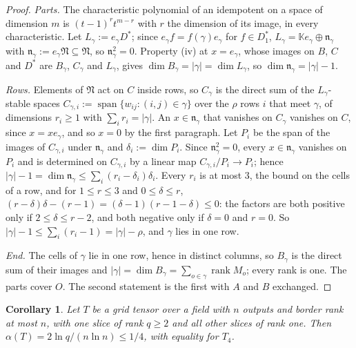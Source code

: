 \documentclass[11pt]{article}
\newtheorem{corollary}[theorem]{Corollary}
\theoremstyle{definition}
\theoremstyle{remark}
\begin{document}
\begin{proof}
\emph{Parts.} The characteristic polynomial of an idempotent on a space of dimension $m$ is $(t-1)^rt^{m-r}$ with $r$ the dimension of its image, in every characteristic. Let $L_\gamma:=e_\gamma D^*$; since $e_\gamma f=f(\gamma)e_\gamma$ for $f\in D^*_1$, $L_\gamma=\mathbb Ke_\gamma\oplus\mathfrak n_\gamma$ with $\mathfrak n_\gamma:=e_\gamma\mathfrak N\subseteq\mathfrak N$, so $\mathfrak n_\gamma^2=0$. Property (iv) at $x=e_\gamma$, whose images on $B$, $C$ and $D^*$ are $B_\gamma$, $C_\gamma$ and $L_\gamma$, gives $\dim B_\gamma=|\gamma|=\dim L_\gamma$, so $\dim\mathfrak n_\gamma=|\gamma|-1$.

\emph{Rows.} Elements of $\mathfrak N$ act on $C$ inside rows, so $C_\gamma$ is the direct sum of the $L_\gamma$-stable spaces $C_{\gamma,i}:=\operatorname{span}\{w_{ij}:(i,j)\in\gamma\}$ over the $\rho$ rows $i$ that meet $\gamma$, of dimensions $r_i\ge1$ with $\sum_ir_i=|\gamma|$. An $x\in\mathfrak n_\gamma$ that vanishes on $C_\gamma$ vanishes on $C$, since $x=xe_\gamma$, and so $x=0$ by the first paragraph. Let $P_i$ be the span of the images of $C_{\gamma,i}$ under $\mathfrak n_\gamma$ and $\delta_i:=\dim P_i$. Since $\mathfrak n_\gamma^2=0$, every $x\in\mathfrak n_\gamma$ vanishes on $P_i$ and is determined on $C_{\gamma,i}$ by a linear map $C_{\gamma,i}/P_i\to P_i$; hence $|\gamma|-1=\dim\mathfrak n_\gamma\le\sum_i(r_i-\delta_i)\delta_i$. Every $r_i$ is at most $3$, the bound on the cells of a row, and for $1\le r\le3$ and $0\le\delta\le r$, $(r-\delta)\delta-(r-1)=(\delta-1)(r-1-\delta)\le0$: the factors are both positive only if $2\le\delta\le r-2$, and both negative only if $\delta=0$ and $r=0$. So $|\gamma|-1\le\sum_i(r_i-1)=|\gamma|-\rho$, and $\gamma$ lies in one row.

\emph{End.} The cells of $\gamma$ lie in one row, hence in distinct columns, so $B_\gamma$ is the direct sum of their images and $|\gamma|=\dim B_\gamma=\sum_{o\in\gamma}\operatorname{rank}M_o$; every rank is one. The parts cover $O$. The second statement is the first with $A$ and $B$ exchanged.
\end{proof}

\begin{corollary}\label{cor:onecell}
Let $T$ be a grid tensor over a field with $n$ outputs and border rank at most $n$, with one slice of rank $q\ge2$ and all other slices of rank one. Then $\alpha(T)=2\ln q/(n\ln n)\le1/4$, with equality for $T_4$.
\end{corollary}
\end{document}
